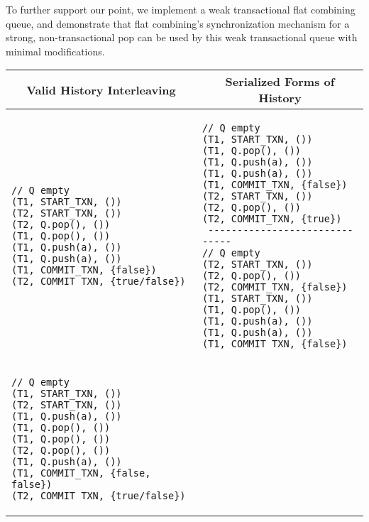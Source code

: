 To further support our point, we implement a weak transactional flat combining queue, and demonstrate that flat combining's synchronization mechanism for a strong, non-transactional pop can be used by this weak transactional queue with minimal modifications.

\begin{table}[H]
    \centering
    \singlespace
    \begin{tabular}{|l|l|}
        \hline
\multicolumn{1}{|c|}{Valid History Interleaving} & \multicolumn{1}{c|}{Serialized Forms of History}\\
        \hline
\begin{lstlisting}
// Q empty
(T1, START_TXN, ())                       
(T2, START_TXN, ())                       
(T2, Q.pop(), ())                       
(T1, Q.pop(), ())                       
(T1, Q.push(a), ())                       
(T1, Q.push(a), ())                       
(T1, COMMIT_TXN, {false})                       
(T2, COMMIT_TXN, {true/false})                       
\end{lstlisting} &
\begin{lstlisting}
// Q empty
(T1, START_TXN, ())                       
(T1, Q.pop(), ())                       
(T1, Q.push(a), ())                       
(T1, Q.push(a), ())                       
(T1, COMMIT_TXN, {false})                       
(T2, START_TXN, ())                       
(T2, Q.pop(), ())                       
(T2, COMMIT_TXN, {true})                       
 ------------------------------
// Q empty
(T2, START_TXN, ())                       
(T2, Q.pop(), ())                       
(T2, COMMIT_TXN, {false})                       
(T1, START_TXN, ())                       
(T1, Q.pop(), ())                       
(T1, Q.push(a), ())                       
(T1, Q.push(a), ())                       
(T1, COMMIT_TXN, {false})                       
\end{lstlisting}\\
\hline
\begin{lstlisting}
// Q empty
(T1, START_TXN, ())                       
(T2, START_TXN, ())                       
(T1, Q.push(a), ())                       
(T1, Q.pop(), ())                       
(T1, Q.pop(), ())                       
(T2, Q.pop(), ())                       
(T1, Q.push(a), ())                       
(T1, COMMIT_TXN, {false, false})                       
(T2, COMMIT_TXN, {true/false})                       
\end{lstlisting} &
\begin{lstlisting}

\end{lstlisting}
\end{tabular}
\end{table}
